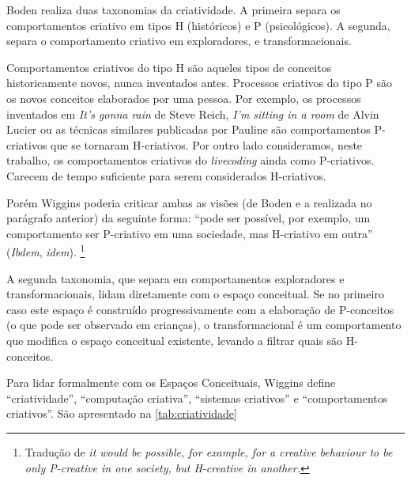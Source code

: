 Boden realiza duas taxonomias da criatividade. A primeira separa os comportamentos criativo em tipos H (históricos) e P (psicológicos). A segunda, separa o comportamento criativo em exploradores, e transformacionais. 

Comportamentos criativos do tipo H são aqueles tipos de conceitos historicamente novos, nunca inventados antes. Processos criativos do tipo P são os novos conceitos elaborados por uma pessoa. Por exemplo, os processos inventados em \emph{It's gonna rain} de Steve Reich, \emph{I'm sitting in a room} de Alvin Lucier ou as técnicas similares publicadas por Pauline  são comportamentos P-criativos que se tornaram H-criativos. Por outro lado consideramos, neste trabalho, os comportamentos criativos do \emph{livecoding} ainda como P-criativos. Carecem de tempo suficiente para serem considerados H-criativos.

Porém Wiggins poderia criticar ambas as visões (de Boden e a realizada no parágrafo anterior) da seguinte forma: ``pode ser possível, por exemplo, um comportamento ser P-criativo em uma sociedade, mas H-criativo em outra'' (\emph{Ibdem}, \emph{idem}). \footnote{Tradução de \emph{it would be possible, for example, for a creative behaviour to be only P-creative in one society, but H-creative in another.}}

A segunda taxonomia, que separa em comportamentos exploradores e transformacionais, lidam diretamente com o espaço conceitual. Se no primeiro caso este espaço é construído progressivamente com a elaboração de P-conceitos (o que pode ser observado em crianças), o transformacional é um comportamento que modifica o espaço conceitual existente, levando a filtrar quais são H-conceitos.

Para lidar formalmente com os Espaços Conceituais, Wiggins define ``criatividade'', ``computação criativa'', ``sistemas criativos'' e ``comportamentos criativos''. São apresentado na \autoref{tab:criatividade}

